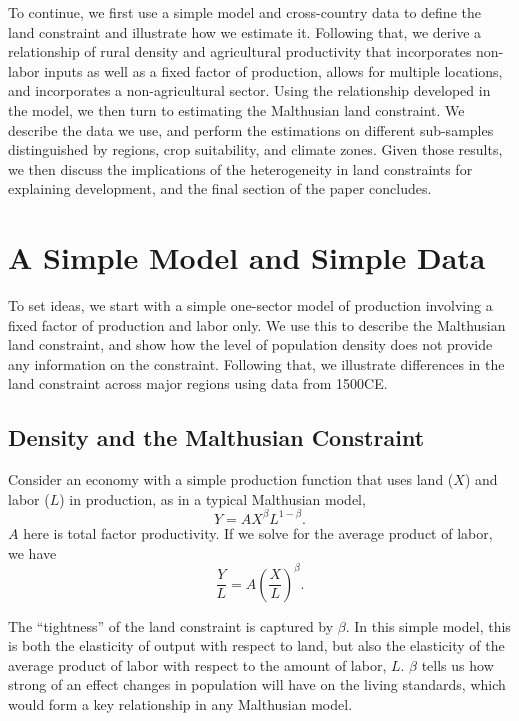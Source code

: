 \documentclass[11pt]{article}
\begin{document}
To continue, we first use a simple model and cross-country data to define the land constraint and illustrate how we estimate it. Following that, we derive a relationship of rural density and agricultural productivity that incorporates non-labor inputs as well as a fixed factor of production, allows for multiple locations, and incorporates a non-agricultural sector. Using the relationship developed in the model, we then turn to estimating the Malthusian land constraint. We describe the data we use, and perform the estimations on different sub-samples distinguished by regions, crop suitability, and climate zones. Given those results, we then discuss the implications of the heterogeneity in land constraints for explaining development, and the final section of the paper concludes.

\section{A Simple Model and Simple Data}
To set ideas, we start with a simple one-sector model of production involving a fixed factor of production and labor only. We use this to describe the Malthusian land constraint, and show how the level of population density does not provide any information on the constraint. Following that, we illustrate differences in the land constraint across major regions using data from 1500CE. 

\subsection{Density and the Malthusian Constraint}
Consider an economy with a simple production function that uses land ($X$) and labor ($L$) in production, as in a typical Malthusian model,
\begin{equation}
Y = A X^\beta L^{1-\beta}.
\end{equation}
$A$ here is total factor productivity. If we solve for the average product of labor, we have
\begin{equation}
    \frac{Y}{L} = A \left(\frac{X}{L}\right)^{\beta}.
\end{equation}

The ``tightness'' of the land constraint is captured by $\beta$. In this simple model, this is both the elasticity of output with respect to land, but also the elasticity of the average product of labor with respect to the amount of labor, $L$. $\beta$ tells us how strong of an effect changes in population will have on the living standards, which would form a key relationship in any Malthusian model.
\end{document}
